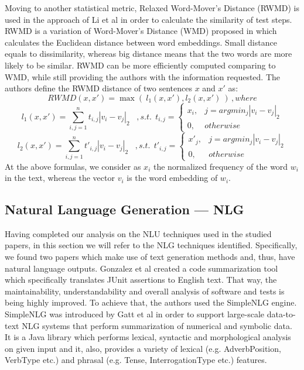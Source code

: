 Moving to another statistical metric, Relaxed Word-Mover's Distance (RWMD) is used in the approach of Li et al \cite{10.1145/3368089.3417067} in order to calculate the similarity of test steps. RWMD is 
a variation of Word-Mover's Distance (WMD) proposed in \cite{pmlr-v37-kusnerb15} which calculates the Euclidean distance between word embeddings. Small distance equals to dissimilarity, whereas big distance means 
that the two words are more likely to be similar. RWMD can be more efficiently computed comparing to WMD, while still providing the authors with the information requested. The authors define the RWMD distance of 
two sentences \(x\) and \(x'\) as:
\[ RWMD(x, x')=\max(\:l_1(x,x'), l_2(x,x')\:)\,   ,  where\]
\[ l_1(x, x')=\sum_{i,j=1}^{n}t_{i,j}|v_i-v_j|_2\, \:\:\:  ,    s.t.\:\:t_{i,j}=\begin{cases}
                                                                x_i, & j = argmin_j|v_i-v_j|_2\\
                                                                0,    &   otherwise \end{cases} \]
\[ l_2(x, x')=\sum_{i,j=1}^{n}t'_{i,j}|v_i-v_j|_2\, \:\:\:  ,    s.t.\:\:t'_{i,j}=\begin{cases}
                                                                x'_j, & j = argmin_j|v_i-v_j|_2\\
                                                                0,    &   otherwise \end{cases} \]
At the above formulas, we consider as \(x_i\) the normalized frequency of the word \(w_i\) in the text, whereas the vector \(v_i\) is the word embedding of \(w_i\).\\

\subsection{Natural Language Generation --- NLG}
Having completed our analysis on the NLU techniques used in the studied papers, in this section we will refer to the NLG techniques identified. Specifically, we found two papers which make use of 
text generation methods and, thus, have natural language outputs. Gonzalez et al \cite{10.1145/3283812.3283819} created a code summarization tool which specifically translates JUnit assertions to English text. 
That way, the maintainability, understandability and overall analysis of software and tests is being highly improved. To achieve that, the authors used the SimpleNLG engine. SimpleNLG was introduced by Gatt et al 
\cite{gatt2009simplenlg} in order to support large-scale data-to-text NLG systems that perform summarization of numerical and symbolic data. It is a Java library which performs lexical, syntactic and 
morphological analysis on given input and it, also, provides a variety of lexical (e.g. AdverbPosition, VerbType etc.) and phrasal (e.g. Tense, InterrogationType etc.) features.\\

